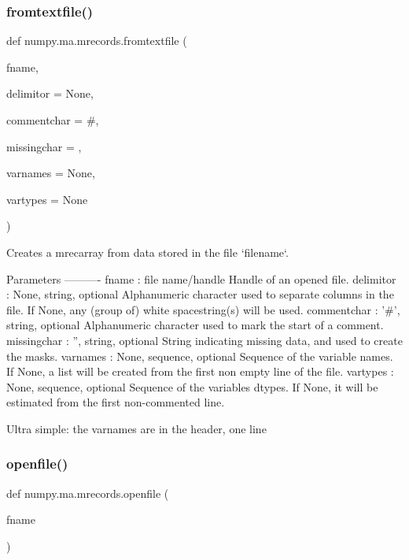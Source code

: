 \subsubsection{\texorpdfstring{fromtextfile()}{fromtextfile()}}
{\footnotesize\ttfamily def numpy.\+ma.\+mrecords.\+fromtextfile (\begin{DoxyParamCaption}\item[{}]{fname,  }\item[{}]{delimitor = {\ttfamily None},  }\item[{}]{commentchar = {\ttfamily \textquotesingle{}\#\textquotesingle{}},  }\item[{}]{missingchar = {\ttfamily \textquotesingle{}\textquotesingle{}},  }\item[{}]{varnames = {\ttfamily None},  }\item[{}]{vartypes = {\ttfamily None} }\end{DoxyParamCaption})}

\begin{DoxyVerb}Creates a mrecarray from data stored in the file `filename`.

Parameters
----------
fname : {file name/handle}
    Handle of an opened file.
delimitor : {None, string}, optional
    Alphanumeric character used to separate columns in the file.
    If None, any (group of) white spacestring(s) will be used.
commentchar : {'#', string}, optional
    Alphanumeric character used to mark the start of a comment.
missingchar : {'', string}, optional
    String indicating missing data, and used to create the masks.
varnames : {None, sequence}, optional
    Sequence of the variable names. If None, a list will be created from
    the first non empty line of the file.
vartypes : {None, sequence}, optional
    Sequence of the variables dtypes. If None, it will be estimated from
    the first non-commented line.


Ultra simple: the varnames are in the header, one line\end{DoxyVerb}
 \mbox{\label{namespacenumpy_1_1ma_1_1mrecords_a6aafb839783f26cf38717f5100938e44}} 
\subsubsection{\texorpdfstring{openfile()}{openfile()}}
{\footnotesize\ttfamily def numpy.\+ma.\+mrecords.\+openfile (\begin{DoxyParamCaption}\item[{}]{fname }\end{DoxyParamCaption})}

